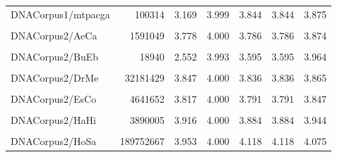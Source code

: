 \documentclass[12pt,twoside]{reedthesis}
\begin{document}
\begin{table}[!h]
{\begin{tabular}[t]{l|r|r|r|r|r|r}
\hline
\cellcolor{gray!6}{DNACorpus1/mpomtcg} & \cellcolor{gray!6}{186609} & \cellcolor{gray!6}{3.218} & \cellcolor{gray!6}{3.999} & \cellcolor{gray!6}{3.682} & \cellcolor{gray!6}{3.682} & \cellcolor{gray!6}{3.896}\\
\hline
DNACorpus1/mtpacga & 100314 & 3.169 & 3.999 & 3.844 & 3.844 & 3.875\\
\hline
\cellcolor{gray!6}{DNACorpus1/vaccg} & \cellcolor{gray!6}{191737} & \cellcolor{gray!6}{3.315} & \cellcolor{gray!6}{3.999} & \cellcolor{gray!6}{3.794} & \cellcolor{gray!6}{3.794} & \cellcolor{gray!6}{3.874}\\
\hline
DNACorpus2/AeCa & 1591049 & 3.778 & 4.000 & 3.786 & 3.786 & 3.874\\
\hline
\cellcolor{gray!6}{DNACorpus2/AgPh} & \cellcolor{gray!6}{43970} & \cellcolor{gray!6}{2.807} & \cellcolor{gray!6}{3.997} & \cellcolor{gray!6}{3.653} & \cellcolor{gray!6}{3.653} & \cellcolor{gray!6}{3.957}\\
\hline
DNACorpus2/BuEb & 18940 & 2.552 & 3.993 & 3.595 & 3.595 & 3.964\\
\hline
\cellcolor{gray!6}{DNACorpus2/DaRe} & \cellcolor{gray!6}{62565020} & \cellcolor{gray!6}{3.928} & \cellcolor{gray!6}{4.000} & \cellcolor{gray!6}{4.013} & \cellcolor{gray!6}{4.013} & \cellcolor{gray!6}{4.035}\\
\hline
DNACorpus2/DrMe & 32181429 & 3.847 & 4.000 & 3.836 & 3.836 & 3.865\\
\hline
\cellcolor{gray!6}{DNACorpus2/EnIn} & \cellcolor{gray!6}{26403087} & \cellcolor{gray!6}{3.918} & \cellcolor{gray!6}{4.000} & \cellcolor{gray!6}{3.893} & \cellcolor{gray!6}{3.893} & \cellcolor{gray!6}{3.928}\\
\hline
DNACorpus2/EsCo & 4641652 & 3.817 & 4.000 & 3.791 & 3.791 & 3.847\\
\hline
\cellcolor{gray!6}{DNACorpus2/GaGa} & \cellcolor{gray!6}{148532294} & \cellcolor{gray!6}{3.776} & \cellcolor{gray!6}{4.000} & \cellcolor{gray!6}{3.943} & \cellcolor{gray!6}{3.943} & \cellcolor{gray!6}{3.897}\\
\hline
DNACorpus2/HaHi & 3890005 & 3.916 & 4.000 & 3.884 & 3.884 & 3.944\\
\hline
\cellcolor{gray!6}{DNACorpus2/HePy} & \cellcolor{gray!6}{1667825} & \cellcolor{gray!6}{3.884} & \cellcolor{gray!6}{4.000} & \cellcolor{gray!6}{3.894} & \cellcolor{gray!6}{3.894} & \cellcolor{gray!6}{3.942}\\
\hline
DNACorpus2/HoSa & 189752667 & 3.953 & 4.000 & 4.118 & 4.118 & 4.075\\
\hline

\end{tabular}}
\end{table}
\end{document}
